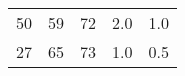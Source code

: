 \begin{table}
\begin{tabular}{ccccc}
50                                                        & 59                                                          & 72                                                  & 2.0                                                                       & 1.0                                                                        \\
27                                                        & 65                                                          & 73                                                  & 1.0                                                                       & 0.5                                                                        \\
\hline
\end{tabular}
\end{table}

